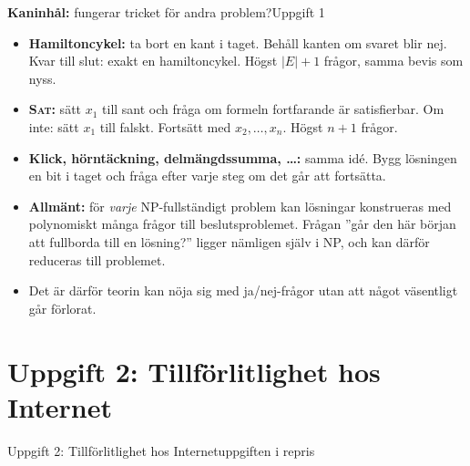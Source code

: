\documentclass[aspectratio=169,10pt]{beamer}
\newcommand{\rabbit}{\textcolor{warnorange}{\textbf{Kaninhål:}} }
\newcommand{\prob}[1]{\textsc{#1}}
\begin{document}
\begin{frame}{\rabbit fungerar tricket för andra problem?}{Uppgift 1}
  \begin{itemize}
    \item<1-> \textbf{Hamiltoncykel:} ta bort en kant i taget. Behåll kanten om svaret blir nej. Kvar till slut: exakt en hamiltoncykel. Högst $|E|+1$ frågor, samma bevis som nyss.
    \item<2-> \textbf{\prob{Sat}:} sätt $x_1$ till sant och fråga om formeln fortfarande är satisfierbar. Om inte: sätt $x_1$ till falskt. Fortsätt med $x_2,\dots,x_n$. Högst $n+1$ frågor.
    \item<3-> \textbf{Klick, hörntäckning, delmängdssumma, \dots:} samma idé. Bygg lösningen en bit i taget och fråga efter varje steg om det går att fortsätta.
    \item<4-> \textbf{Allmänt:} för \emph{varje} NP-fullständigt problem kan lösningar konstrueras med polynomiskt många frågor till beslutsproblemet. Frågan ''går den här början att fullborda till en lösning?'' ligger nämligen själv i NP, och kan därför reduceras till problemet.
    \item<5-> Det är därför teorin kan nöja sig med ja/nej-frågor utan att något väsentligt går förlorat.
  \end{itemize}
\end{frame}

\section{Uppgift 2: Tillförlitlighet hos Internet}

\begin{frame}{Uppgift 2: Tillförlitlighet hos Internet}{uppgiften i repris}
  \uppgiftTva
\end{frame}

\newcommand{\prisma}{%
  \node[vx] (v1) at (90:2.0) {1}; \node[vx] (v2) at (210:2.0) {2}; \node[vx] (v3) at (330:2.0) {3};
  \node[vx] (v4) at (90:0.8) {4}; \node[vx] (v5) at (210:0.8) {5}; \node[vx] (v6) at (330:0.8) {6};}
\newcommand{\prismakoord}{%
  \coordinate (v1) at (90:2.0); \coordinate (v2) at (210:2.0); \coordinate (v3) at (330:2.0);
  \coordinate (v4) at (90:0.8); \coordinate (v5) at (210:0.8); \coordinate (v6) at (330:0.8);}
\newcommand{\prismanoder}[1][]{\foreach \k in {1,...,6} \node[vx,#1] at (v\k) {\k};}
\end{document}
